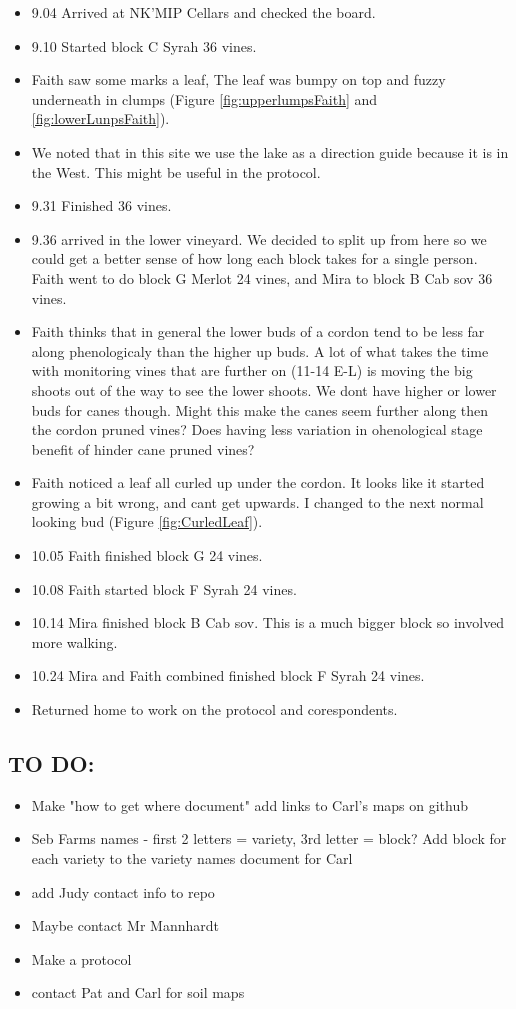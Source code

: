 \documentclass[11pt,letter]{article}
\newenvironment{smitemize}{
\begin{itemize}
  \setlength{\itemsep}{0pt}
  \setlength{\parskip}{0.8pt}
  \setlength{\parsep}{0pt}}
{\end{itemize}
}
\begin{document}
\begin{smitemize}
\item 9.04 Arrived at NK'MIP Cellars and checked the board. 
\item 9.10 Started block C Syrah 36 vines.
\item Faith saw some marks a leaf, The leaf was bumpy on top and fuzzy underneath in clumps (Figure \ref{fig:upperlumpsFaith} and \ref{fig:lowerLunpsFaith}).
\item We noted that in this site we use the lake as a direction guide because it is in the West. This might be useful in the protocol. 
\item 9.31 Finished 36 vines.  
\item 9.36 arrived in the lower vineyard. We decided to split up from here so we could get a better sense of how long each block takes for a single person. Faith went to do block G Merlot 24 vines, and Mira to block B Cab sov 36 vines. 
\item Faith thinks that in general the lower buds of a cordon tend to be less far along phenologicaly than the higher up buds. A lot of what takes the time with monitoring vines that are further on (11-14 E-L) is moving the big shoots out of the way to see the lower shoots. We dont have higher or lower buds for canes though. Might this make the canes seem further along then the cordon pruned vines? Does having less variation in ohenological stage benefit of hinder cane pruned vines?
\item Faith noticed a leaf all curled up under the cordon. It looks like it started growing a bit wrong, and cant get upwards. I changed to the next normal looking bud (Figure \ref{fig:CurledLeaf}).
\item 10.05 Faith finished block G 24 vines.
\item 10.08 Faith started block F Syrah 24 vines.
\item 10.14 Mira finished block B Cab sov. This is a much bigger block so involved more walking. 
\item 10.24 Mira and Faith combined finished block F Syrah 24 vines.
\item Returned home to work on the protocol and corespondents. 

\end{smitemize}


\subsection{TO DO:}
\begin{smitemize}
\item Make "how to get where document" add links to Carl's maps on github
\item Seb Farms names - first 2 letters = variety, 3rd letter = block? Add block for each variety to the variety names document for Carl
\item add Judy contact info to repo
\item Maybe contact Mr Mannhardt 
\item Make a protocol 
\item contact Pat and Carl for soil maps 
\end{smitemize}
\end{document}
